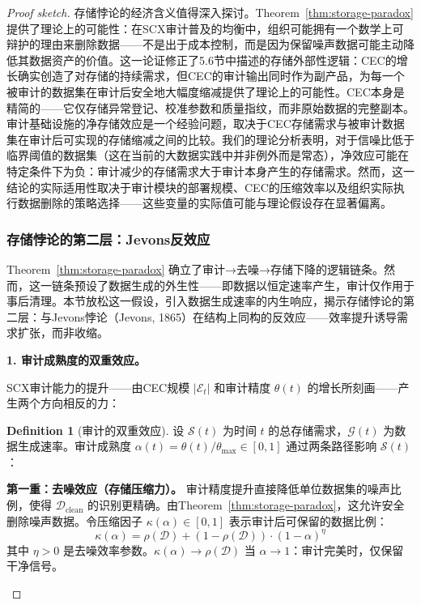 \documentclass[12pt,a4paper]{ctexart}
\theoremstyle{definition}
\newtheorem{definition}{Definition}[section]
\theoremstyle{remark}
\begin{document}
\begin{proof}[Proof sketch]
存储悖论的经济含义值得深入探讨。Theorem~\ref{thm:storage-paradox} 提供了理论上的可能性：在SCX审计普及的均衡中，组织可能拥有一个数学上可辩护的理由来删除数据——不是出于成本控制，而是因为保留噪声数据可能主动降低其数据资产的价值。这一论证修正了5.6节中描述的存储外部性逻辑：CEC的增长确实创造了对存储的持续需求，但CEC的审计输出同时作为副产品，为每一个被审计的数据集在审计后安全地大幅度缩减提供了理论上的可能性。CEC本身是精简的——它仅存储异常登记、校准参数和质量指纹，而非原始数据的完整副本。审计基础设施的净存储效应是一个经验问题，取决于CEC存储需求与被审计数据集在审计后可实现的存储缩减之间的比较。我们的理论分析表明，对于信噪比低于临界阈值的数据集（这在当前的大数据实践中并非例外而是常态），净效应可能在特定条件下为负：审计减少的存储需求大于审计本身产生的存储需求。然而，这一结论的实际适用性取决于审计模块的部署规模、CEC的压缩效率以及组织实际执行数据删除的策略选择——这些变量的实际值可能与理论假设存在显著偏离。

\subsubsection{存储悖论的第二层：Jevons反效应}

Theorem~\ref{thm:storage-paradox} 确立了审计→去噪→存储下降的逻辑链条。然而，这一链条预设了数据生成的外生性——即数据以恒定速率产生，审计仅作用于事后清理。本节放松这一假设，引入数据生成速率的内生响应，揭示存储悖论的第二层：与Jevons悖论（Jevons, 1865）在结构上同构的反效应——效率提升诱导需求扩张，而非收缩。

\medskip
\noindent\textbf{1. 审计成熟度的双重效应。}

SCX审计能力的提升——由CEC规模 $|\mathcal{E}_t|$ 和审计精度 $\theta(t)$ 的增长所刻画——产生两个方向相反的力：

\begin{definition}[审计的双重效应]
设 $\mathcal{S}(t)$ 为时间 $t$ 的总存储需求，$\mathcal{G}(t)$ 为数据生成速率。审计成熟度 $\alpha(t) = \theta(t) / \theta_{\max} \in [0, 1]$ 通过两条路径影响 $\mathcal{S}(t)$：

\textbf{第一重：去噪效应（存储压缩力）。} 审计精度提升直接降低单位数据集的噪声比例，使得 $\mathcal{D}_{\text{clean}}$ 的识别更精确。由Theorem~\ref{thm:storage-paradox}，这允许安全删除噪声数据。令压缩因子 $\kappa(\alpha) \in [0, 1]$ 表示审计后可保留的数据比例：
\begin{equation}
\kappa(\alpha) = \rho(\mathcal{D}) + (1 - \rho(\mathcal{D})) \cdot (1 - \alpha)^{\eta}
\end{equation}
其中 $\eta > 0$ 是去噪效率参数。$\kappa(\alpha) \to \rho(\mathcal{D})$ 当 $\alpha \to 1$：审计完美时，仅保留干净信号。


\end{definition}
\end{proof}
\end{document}

